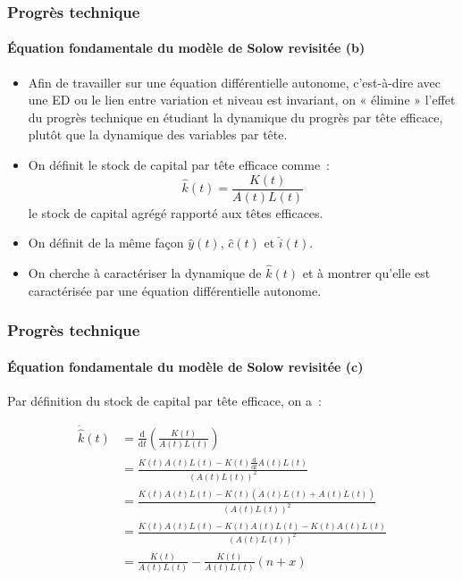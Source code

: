 \documentclass[10pt,notheorems]{beamer}
\theoremstyle{plain}
\theoremstyle{definition} %
\begin{document}
\begin{frame}
  \frametitle{Progrès technique}
  \framesubtitle{Équation fondamentale du modèle de Solow revisitée (b)}

  \bigskip

  \begin{itemize}

  \item Afin de travailler sur une équation différentielle autonome, c'est-à-dire avec une ED ou le lien entre variation et niveau est invariant, on « élimine » l'effet du progrès technique en étudiant la dynamique du progrès par tête efficace, plutôt que la dynamique des variables par tête.\newline

  \item On définit le stock de capital par tête efficace comme~:
    \[
      \hat k(t) = \frac{K(t)}{A(t)L(t)}
    \]
    le stock de capital agrégé rapporté aux têtes efficaces.\newline

  \item On définit de la même façon $\hat y(t)$, $\hat c(t)$ et $\hat i(t)$.\newline

  \item On cherche à caractériser la dynamique de $\hat k(t)$ et à montrer qu'elle est caractérisée par une équation différentielle autonome.\newline

  \end{itemize}

\end{frame}


\begin{frame}
  \frametitle{Progrès technique}
  \framesubtitle{Équation fondamentale du modèle de Solow revisitée (c)}

  \bigskip

  Par définition du stock de capital par tête efficace, on a~:\newline

  \[
    \begin{split}
      \dot{\hat k}(t) &= \frac{\mathrm d}{\mathrm dt}\left(\frac{K(t)}{A(t)L(t)}\right)\\
      &= \frac{\dot K(t) A(t)L(t) - K(t)\frac{\mathrm d}{\mathrm dt}A(t)L(t)}{\left(A(t)L(t)\right)^2}\\
      &= \frac{\dot K(t) A(t)L(t) - K(t)\left(\dot A(t)L(t) + A(t)\dot L(t)\right)}{\left(A(t)L(t)\right)^2}\\
      &= \frac{\dot K(t) A(t)L(t) - K(t)\dot A(t)L(t) - K(t)A(t)\dot L(t)}{\left(A(t)L(t)\right)^2}\\
      &= \frac{\dot K(t)}{A(t)L(t)} - \frac{K(t)}{A(t)L(t)} (n+x)
    \end{split}
  \]

\end{frame}
\end{document}
